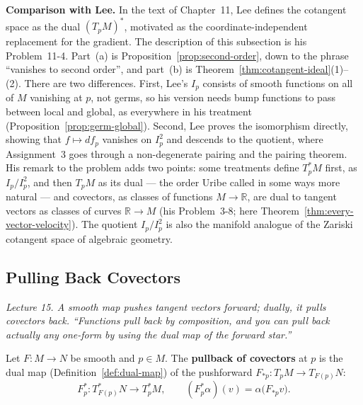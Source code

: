 \documentclass[11pt]{report}
\makeatletter
\newcounter{defcounter}[section]
\newcommand{\deflabel}[1]{\edef\@currentlabel{\arabic{section}.\arabic{defcounter}}\label{#1}}
\newcommand{\leeref}[1]{\par\smallskip{\raggedleft\footnotesize\textsc{Lee}:\ #1\par}}
\makeatother
\begin{document}
\textbf{Comparison with Lee.} In the text of Chapter~11, Lee defines the cotangent space as the dual $(T_pM)^*$, motivated as the coordinate-independent replacement for the gradient. The description of this subsection is his Problem~11-4. Part~(a) is Proposition~\ref{prop:second-order}, down to the phrase ``vanishes to second order'', and part~(b) is Theorem~\ref{thm:cotangent-ideal}(1)--(2). There are two differences. First, Lee's $I_p$ consists of smooth functions on all of $M$ vanishing at $p$, not germs, so his version needs bump functions to pass between local and global, as everywhere in his treatment (Proposition~\ref{prop:germ-global}). Second, Lee proves the isomorphism directly, showing that $f \mapsto df_p$ vanishes on $I_p^2$ and descends to the quotient, where Assignment~3 goes through a non-degenerate pairing and the pairing theorem. His remark to the problem adds two points: some treatments define $T_p^*M$ first, as $I_p/I_p^2$, and then $T_pM$ as its dual --- the order Uribe called in some ways more natural --- and covectors, as classes of functions $M \to \mathbb{R}$, are dual to tangent vectors as classes of curves $\mathbb{R} \to M$ (his Problem~3-8; here Theorem~\ref{thm:every-vector-velocity}). The quotient $I_p/I_p^2$ is also the manifold analogue of the Zariski cotangent space of algebraic geometry.


\subsection{Pulling Back Covectors}\label{sub:pullback-covectors}

\textit{Lecture 15. A smooth map pushes tangent vectors forward; dually, it pulls covectors back. ``Functions pull back by composition, and you can pull back actually any one-form by using the dual map of the forward star.''}

\begin{defbox}\deflabel{def:pullback-covector}
Let $F : M \to N$ be smooth and $p \in M$. The \textbf{pullback of covectors} at $p$ is the dual map (Definition~\ref{def:dual-map}) of the pushforward $F_{*p} : T_pM \to T_{F(p)}N$:
\[
F_p^* : T^*_{F(p)}N \longrightarrow T_p^*M, \qquad (F_p^*\alpha)(v) = \alpha\big(F_{*p}v\big) .
\]
\leeref{Ch.~11, \emph{Pullbacks of Covector Fields}}
\end{defbox}
\end{document}
